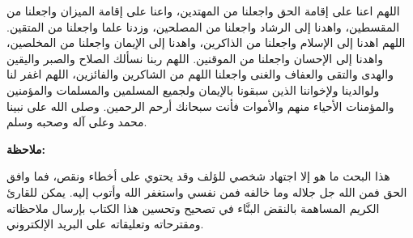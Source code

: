 اللهم اعنا على إقامة الحق واجعلنا من المهتدين، واعنا على إقامة الميزان واجعلنا من المقسطين، واهدنا إلى الرشاد واجعلنا من المصلحين، وزدنا علما واجعلنا من المتقين. اللهم اهدنا إلى الإسلام واجعلنا من الذاكرين، واهدنا إلى الإيمان واجعلنا من المخلصين، واهدنا إلى الإحسان واجعلنا من الموقنين. اللهم ربنا نسألك الصلاح والصبر واليقين والهدى والتقى والعفاف والغنى واجعلنا اللهم من الشاكرين والفائزين، اللهم اغفر لنا ولوالدينا ولإخواننا الذين سبقونا بالإيمان ولجميع المسلمين والمسلمات والمؤمنين والمؤمنات الأحياء منهم والأموات فأنت سبحانك أرحم الرحمين. وصلى الله على نبينا محمد وعلى آله وصحبه وسلم.

\newpage
\vspace*{\fill}
\textbf{ملاحظة:}

هذا البحث ما هو إلا اجتهاد شخصي للؤلف وقد يحتوي على أخطاء ونقص، فما وافق الحق فمن الله جل جلاله وما خالفه فمن نفسي واستغفر الله وأتوب إليه. يمكن للقارئ الكريم المساهمة بالنقض البنَّاء في تصحيح وتحسين هذا الكتاب بإرسال ملاحظاته ومقترحاته وتعليقاته على البريد الإلكتروني.
